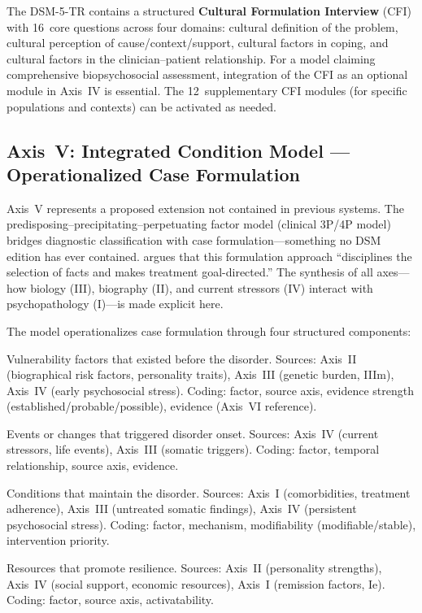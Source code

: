 \documentclass[11pt,a4paper]{article}
\begin{document}
The DSM-5-TR contains a structured \textbf{Cultural Formulation Interview} (CFI) with 16~core questions across four domains: cultural definition of the problem, cultural perception of cause/context/support, cultural factors in coping, and cultural factors in the clinician--patient relationship. For a model claiming comprehensive biopsychosocial assessment, integration of the CFI as an optional module in Axis~IV is essential. The 12~supplementary CFI modules (for specific populations and contexts) can be activated as needed.

\subsection{Axis~V: Integrated Condition Model --- Operationalized Case Formulation}
\label{sec:axis5}

Axis~V represents a proposed extension not contained in previous systems. The predisposing--precipitating--perpetuating factor model (clinical 3P/4P model) bridges diagnostic classification with case formulation---something no DSM edition has ever contained. \citet{Owen2023} argues that this formulation approach ``disciplines the selection of facts and makes treatment goal-directed.'' The synthesis of all axes---how biology (III), biography (II), and current stressors (IV) interact with psychopathology (I)---is made explicit here.

The model operationalizes case formulation through four structured components:

\begin{description}[style=nextline, leftmargin=1.5cm, font=\bfseries]
\item[Predisposing Factors (P1)] Vulnerability factors that existed before the disorder. Sources: Axis~II (biographical risk factors, personality traits), Axis~III (genetic burden, IIIm), Axis~IV (early psychosocial stress). Coding: factor, source axis, evidence strength (established/probable/possible), evidence (Axis~VI reference).
\item[Precipitating Factors (P2)] Events or changes that triggered disorder onset. Sources: Axis~IV (current stressors, life events), Axis~III (somatic triggers). Coding: factor, temporal relationship, source axis, evidence.
\item[Perpetuating Factors (P3)] Conditions that maintain the disorder. Sources: Axis~I (comorbidities, treatment adherence), Axis~III (untreated somatic findings), Axis~IV (persistent psychosocial stress). Coding: factor, mechanism, modifiability (modifiable/stable), intervention priority.
\item[Protective Factors (P4)] Resources that promote resilience. Sources: Axis~II (personality strengths), Axis~IV (social support, economic resources), Axis~I (remission factors, Ie). Coding: factor, source axis, activatability.
\end{description}
\end{document}
